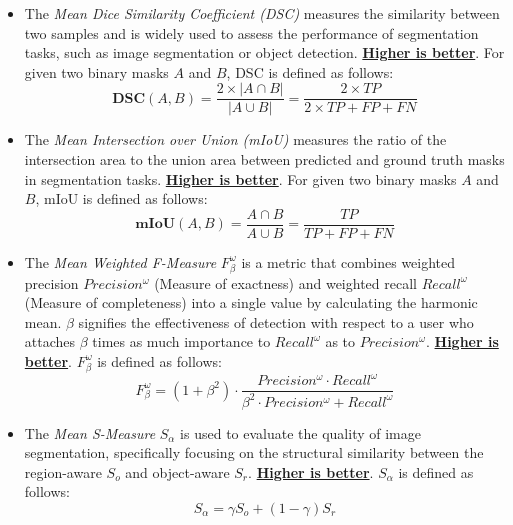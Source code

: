 \begin{itemize}
    \item The \textit{Mean Dice Similarity Coefficient (DSC)} \cite{milletari2016v} measures the similarity between two samples and is widely used to assess the performance of segmentation tasks, such as image segmentation or object detection. \textbf{\underline{Higher is better}}. For given two binary masks $A$ and $B$, DSC is defined as follows:
    \begin{equation}
        \textbf{DSC}(A, B) = \frac{2 \times | A \cap B |}{| A \cup B |} = \frac{2 \times TP}{2 \times TP + FP + FN}
    \end{equation}

    \item The \textit{Mean Intersection over Union (mIoU)} measures the ratio of the intersection area to the union area between predicted and ground truth masks in segmentation tasks. \textbf{\underline{Higher is better}}. For given two binary masks $A$ and $B$, mIoU is defined as follows:
    \begin{equation}
        \textbf{mIoU}(A, B) = \frac{A \cap B}{A \cup B} = \frac{TP}{TP + FP + FN}
    \end{equation}

    \item The \textit{Mean Weighted F-Measure} $F_{\beta}^{\omega}$ \cite{margolin2014evaluate} is a metric that combines weighted precision $Precision^{\omega}$ (Measure of exactness) and weighted recall $Recall^{\omega}$ (Measure of completeness) into a single value by calculating the harmonic mean. $\beta$ signifies the effectiveness of detection with respect to a user who attaches $\beta$ times as much importance to $Recall^{\omega}$ as to $Precision^{\omega}$. \textbf{\underline{Higher is better}}. $F_{\beta}^{\omega}$ is defined as follows:
    \begin{equation}
        F_{\beta}^{\omega} = (1 + \beta^{2}) \cdot \frac{Precision^{\omega} \cdot Recall^{\omega}}{\beta^{2} \cdot Precision^{\omega} + Recall^{\omega}}
    \end{equation}

    \item The \textit{Mean S-Measure} $S_{\alpha}$ \cite{fan2017structure} is used to evaluate the quality of image segmentation, specifically focusing on the structural similarity between the region-aware $S_{o}$ and object-aware $S_{r}$. \textbf{\underline{Higher is better}}. $S_{\alpha}$ is defined as follows:
    \begin{equation}
        S_{\alpha} = \gamma S_{o} + (1 - \gamma) S_{r}
    \end{equation}
    

\end{itemize}
